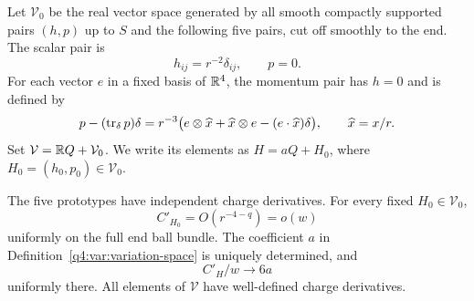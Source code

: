 \begin{definition}
\label{q4:var:variation-space}
Let $\mathcal V_0$ be the real vector space generated by all smooth compactly
supported pairs $(h,p)$ up to $S$ and the following five pairs, cut off
smoothly to the end. The scalar pair is
\[
 h_{ij}=r^{-2}\delta_{ij},\qquad p=0.
\]
For each vector $e$ in a fixed basis of $\mathbb R^4$, the momentum pair has
$h=0$ and is defined by
\begin{equation}
 p-(\operatorname{tr}_\delta p)\delta
 =r^{-3}\bigl(e\otimes\widehat x+\widehat x\otimes e
                  -(e\cdot\widehat x)\delta\bigr),
 \qquad \widehat x=x/r.
\label{q4:var:momentum-prototype}
\end{equation}
Set $\mathcal V=\mathbb R Q+\mathcal V_0$. We write its elements as
$H=aQ+H_0$, where $H_0=(h_0,p_0)\in\mathcal V_0$.
\end{definition}

\begin{lemma}
\label{q4:var:end-variations}
The five prototypes have independent charge derivatives. For every fixed
$H_0\in\mathcal V_0$,
\begin{equation}
 C'_{H_0}=O(r^{-4-q})=o(w)
\label{q4:var:prototype-constraint-decay}
\end{equation}
uniformly on the full end ball bundle. The coefficient $a$ in
Definition~\ref{q4:var:variation-space} is uniquely determined, and
\begin{equation}
 C'_H/w\longrightarrow6a
\label{q4:var:end-value}
\end{equation}
uniformly there. All elements of $\mathcal V$ have well-defined charge
derivatives.
\end{lemma}

